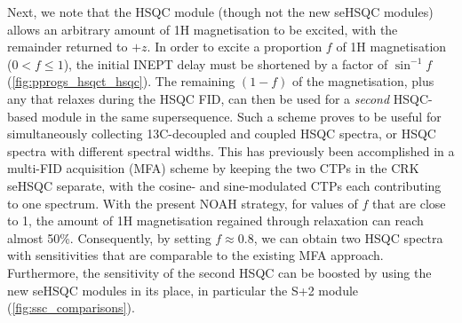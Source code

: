 \documentclass[11pt]{article}
\newcommand*{\noahSpb}{S+2}
\newcommand*{\carbon}{13C}
\newcommand*{\magn}[1]{1H#1}
\begin{document}
\begin{refsection}
Next, we note that the HSQC module (though not the new seHSQC modules) allows an arbitrary amount of \magn{} magnetisation to be excited, with the remainder returned to $+z$.\autocite{Kupce2007MRC, Schulze-Sunninghausen2014JACS, Schulze-Sunninghausen2017JMR, Koos2019JMR}
In order to excite a proportion $f$ of \magn{} magnetisation ($0 < f \leq 1$), the initial INEPT delay must be shortened by a factor of $\sin^{-1}f$ (\cref{fig:pprogs_hsqct_hsqc}).
The remaining $(1 - f)$ of the magnetisation, plus any that relaxes during the HSQC FID, can then be used for a \textit{second} HSQC-based module in the same supersequence.
Such a scheme proves to be useful for simultaneously collecting \carbon{}-decoupled and coupled HSQC spectra, or HSQC spectra with different spectral widths.
This has previously been accomplished in a multi-FID acquisition (MFA) scheme by keeping the two CTPs in the CRK seHSQC separate, with the cosine- and sine-modulated CTPs each contributing to one spectrum.\autocite{ctphsqc}
With the present NOAH strategy, for values of $f$ that are close to 1, the amount of \magn{} magnetisation regained through relaxation can reach almost 50\%.
Consequently, by setting $f \approx 0.8$, we can obtain two HSQC spectra with sensitivities that are comparable to the existing MFA approach.
Furthermore, the sensitivity of the second HSQC can be boosted by using the new seHSQC modules in its place, in particular the \noahSpb{} module (\cref{fig:ssc_comparisons}).


\end{refsection}
\end{document}
